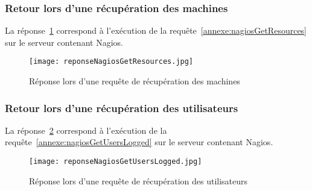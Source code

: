 \begin{appendices}
\begin{figure}[!ht]
\end{figure}

\subsubsection{Retour lors d'une r\'ecup\'eration des machines}

La r\'eponse~\ref{annexe:reponseNagiosGetResources} correspond \`a l'ex\'ecution de la requ\^ete~\ref{annexe:nagiosGetResources} sur le serveur contenant Nagios.

\begin{figure}[!ht]
	\centering
	\texttt{[image: reponseNagiosGetResources.jpg]}
	\caption{R\'eponse lors d'une requ\^ete de r\'ecup\'eration des machines}
	\label{annexe:reponseNagiosGetResources}

\end{figure}

\subsubsection{Retour lors d'une r\'ecup\'eration des utilisateurs}

La r\'eponse~\ref{annexe:reponseNagiosGetUsersLogged} correspond \`a l'ex\'ecution de la requ\^ete~\ref{annexe:nagiosGetUsersLogged} sur le serveur contenant Nagios.

\begin{figure}[!ht]
	\centering
	\texttt{[image: reponseNagiosGetUsersLogged.jpg]}
	\caption{R\'eponse lors d'une requ\^ete de r\'ecup\'eration des utilisateurs}
	\label{annexe:reponseNagiosGetUsersLogged}

\end{figure}

\end{appendices}

\clearpage

